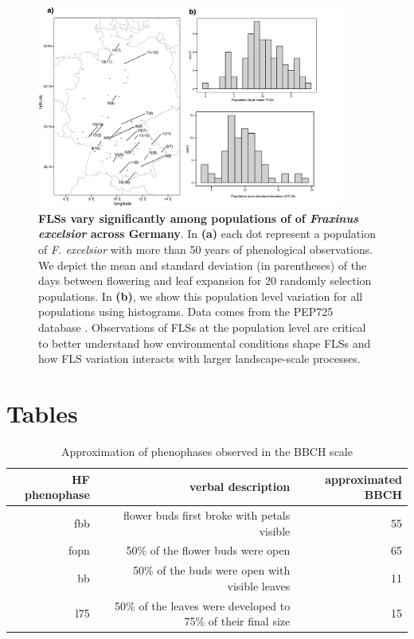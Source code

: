 \documentclass[11pt]{article}
\begin{document}
  \begin{figure}[H]
  \centering
  \includegraphics[width=0.9\textwidth]{..//..//popmap.png} 
  \caption{\textbf{FLSs vary significantly among populations of of \emph{Fraxinus excelsior} across Germany}. In \textbf{(a)} each dot represent a population of \emph{F. excelsior} with more than 50 years of phenological observations. We depict the mean and standard deviation (in parentheses) of the days between flowering and leaf expansion for 20 randomly selection populations. In \textbf{(b)}, we show this population level variation for all populations using histograms. Data comes from the PEP725 database \citep{PEP725}. Observations of FLSs at the population level are critical to better understand how environmental conditions shape FLSs and how FLS variation interacts with larger landscape-scale processes.}
  \label{fig:popmap}
  \end{figure}
  
  \pagebreak[4]
  
  \section*{Tables}
  
  \begin{table}[H]
  \centering
  \begin{tabular}{rrr}
  \hline
  HF phenophase & verbal description & approximated BBCH  \\ 
  \hline
  fbb & flower buds first broke with petals visible & 55 \\
  fopn &  50\% of the flower buds were open & 65 \\
  bb &  50\% of the buds were open with visible leaves & 11 \\
  l75 & 50\% of the leaves were developed to 75\% of their final size &  15 \\
  \hline
  \end{tabular}
  \caption{Approximation of phenophases observed in \citep{OKeefe2015} the BBCH scale \citep{Finn2007}} 
  \label{tab:BBCH2HF}
  \end{table}
  
\end{document}
